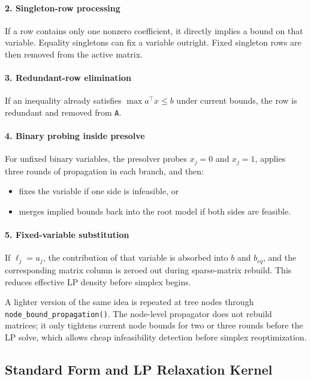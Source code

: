 \paragraph{2. Singleton-row processing}
If a row contains only one nonzero coefficient, it directly implies a bound on that variable. Equality singletons can fix a variable outright. Fixed singleton rows are then removed from the active matrix.

\paragraph{3. Redundant-row elimination}
If an inequality already satisfies \(\max a^\top x \le b\) under current bounds, the row is redundant and removed from \texttt{A}.

\paragraph{4. Binary probing inside presolve}
For unfixed binary variables, the presolver probes \(x_j=0\) and \(x_j=1\), applies three rounds of propagation in each branch, and then:
\begin{itemize}
  \item fixes the variable if one side is infeasible, or
  \item merges implied bounds back into the root model if both sides are feasible.
\end{itemize}

\paragraph{5. Fixed-variable substitution}
If \(\ell_j=u_j\), the contribution of that variable is absorbed into \(b\) and \(b_{eq}\), and the corresponding matrix column is zeroed out during sparse-matrix rebuild. This reduces effective LP density before simplex begins.

A lighter version of the same idea is repeated at tree nodes through
\texttt{node\_bound\_propagation()}. The node-level propagator does not rebuild matrices; it only tightens current node bounds for two or three rounds before the LP solve, which allows cheap infeasibility detection before simplex reoptimization.

\subsection{Standard Form and LP Relaxation Kernel}

